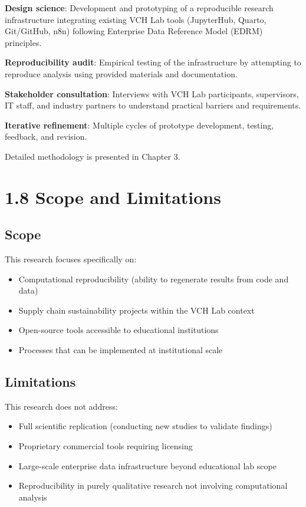 \documentclass[
  oneside,
  open=any]{scrbook}
\providecommand{\tightlist}{%
  \setlength{\itemsep}{0pt}\setlength{\parskip}{0pt}}\usepackage{longtable,booktabs,array}
\begin{document}
\textbf{Design science}: Development and prototyping of a reproducible
research infrastructure integrating existing VCH Lab tools (JupyterHub,
Quarto, Git/GitHub, n8n) following Enterprise Data Reference Model
(EDRM) principles.

\textbf{Reproducibility audit}: Empirical testing of the infrastructure
by attempting to reproduce analysis using provided materials and
documentation.

\textbf{Stakeholder consultation}: Interviews with VCH Lab participants,
supervisors, IT staff, and industry partners to understand practical
barriers and requirements.

\textbf{Iterative refinement}: Multiple cycles of prototype development,
testing, feedback, and revision.

Detailed methodology is presented in Chapter 3.

\section{1.8 Scope and Limitations}\label{scope-and-limitations}

\subsection{Scope}\label{scope}

This research focuses specifically on:

\begin{itemize}
\tightlist
\item
  Computational reproducibility (ability to regenerate results from code
  and data)
\item
  Supply chain sustainability projects within the VCH Lab context
\item
  Open-source tools accessible to educational institutions
\item
  Processes that can be implemented at institutional scale
\end{itemize}

\subsection{Limitations}\label{limitations}

This research does not address:

\begin{itemize}
\tightlist
\item
  Full scientific replication (conducting new studies to validate
  findings)
\item
  Proprietary commercial tools requiring licensing
\item
  Large-scale enterprise data infrastructure beyond educational lab
  scope
\item
  Reproducibility in purely qualitative research not involving
  computational analysis
\end{itemize}
\end{document}
